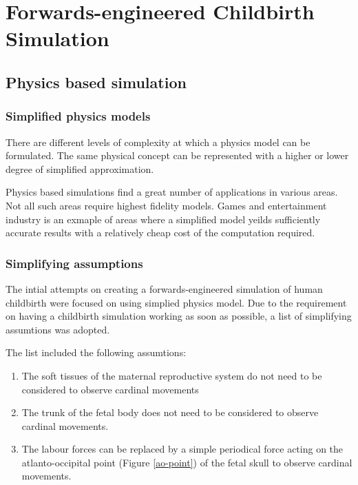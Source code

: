 \section{Forwards-engineered Childbirth Simulation}\label{methodology-basic}

\subsection{Physics based simulation}

  \subsubsection{Simplified physics models}

  There are different levels of complexity at which a physics model can be formulated. The same physical concept can be represented with a higher or lower degree of simplified approximation.

  Physics based simulations find a great number of applications in various areas. Not all such areas require highest fidelity models. Games and entertainment industry is an exmaple of areas where a simplified model yeilds sufficiently accurate results with a relatively cheap cost of the computation required.

  \subsubsection{Simplifying assumptions}

  The intial attempts on creating a forwards-engineered simulation of human childbirth were focused on using simplied physics model. Due to the requirement on having a childbirth simulation working as soon as possible, a list of simplifying assumtions was adopted.

  The list included the following assumtions:

  \begin{enumerate}

    \item The soft tissues of the maternal reproductive system do not need to be considered to observe cardinal movements
    \item The trunk of the fetal body does not need to be considered to observe cardinal movements.
    \item The labour forces can be replaced by a simple periodical force acting on the atlanto-occipital point (Figure \ref{ao-point}) of the fetal skull to observe cardinal movements.

  \end{enumerate}

